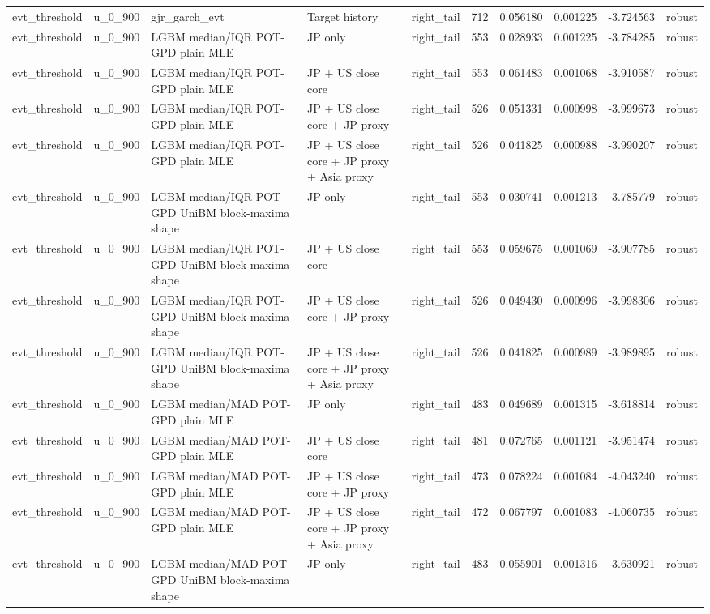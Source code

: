 \begin{tabular}{lll l lrrrrl}
evt\_threshold & u\_0\_900 & gjr\_garch\_evt & Target history & right\_tail & 712 & 0.056180 & 0.001225 & -3.724563 & robust \\
evt\_threshold & u\_0\_900 & LGBM median/IQR POT-GPD plain MLE & JP only & right\_tail & 553 & 0.028933 & 0.001225 & -3.784285 & robust \\
evt\_threshold & u\_0\_900 & LGBM median/IQR POT-GPD plain MLE & JP + US close core & right\_tail & 553 & 0.061483 & 0.001068 & -3.910587 & robust \\
evt\_threshold & u\_0\_900 & LGBM median/IQR POT-GPD plain MLE & JP + US close core + JP proxy & right\_tail & 526 & 0.051331 & 0.000998 & -3.999673 & robust \\
evt\_threshold & u\_0\_900 & LGBM median/IQR POT-GPD plain MLE & JP + US close core + JP proxy + Asia proxy & right\_tail & 526 & 0.041825 & 0.000988 & -3.990207 & robust \\
evt\_threshold & u\_0\_900 & LGBM median/IQR POT-GPD UniBM block-maxima shape & JP only & right\_tail & 553 & 0.030741 & 0.001213 & -3.785779 & robust \\
evt\_threshold & u\_0\_900 & LGBM median/IQR POT-GPD UniBM block-maxima shape & JP + US close core & right\_tail & 553 & 0.059675 & 0.001069 & -3.907785 & robust \\
evt\_threshold & u\_0\_900 & LGBM median/IQR POT-GPD UniBM block-maxima shape & JP + US close core + JP proxy & right\_tail & 526 & 0.049430 & 0.000996 & -3.998306 & robust \\
evt\_threshold & u\_0\_900 & LGBM median/IQR POT-GPD UniBM block-maxima shape & JP + US close core + JP proxy + Asia proxy & right\_tail & 526 & 0.041825 & 0.000989 & -3.989895 & robust \\
evt\_threshold & u\_0\_900 & LGBM median/MAD POT-GPD plain MLE & JP only & right\_tail & 483 & 0.049689 & 0.001315 & -3.618814 & robust \\
evt\_threshold & u\_0\_900 & LGBM median/MAD POT-GPD plain MLE & JP + US close core & right\_tail & 481 & 0.072765 & 0.001121 & -3.951474 & robust \\
evt\_threshold & u\_0\_900 & LGBM median/MAD POT-GPD plain MLE & JP + US close core + JP proxy & right\_tail & 473 & 0.078224 & 0.001084 & -4.043240 & robust \\
evt\_threshold & u\_0\_900 & LGBM median/MAD POT-GPD plain MLE & JP + US close core + JP proxy + Asia proxy & right\_tail & 472 & 0.067797 & 0.001083 & -4.060735 & robust \\
evt\_threshold & u\_0\_900 & LGBM median/MAD POT-GPD UniBM block-maxima shape & JP only & right\_tail & 483 & 0.055901 & 0.001316 & -3.630921 & robust \\

\end{tabular}
